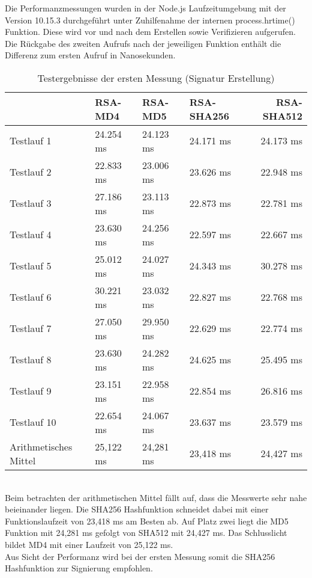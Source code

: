 Die Performanzmessungen wurden in der Node.js Laufzeitumgebung mit der Version 10.15.3 durchgeführt unter Zuhilfenahme der internen process.hrtime() Funktion. Diese wird vor und nach dem Erstellen sowie Verifizieren aufgerufen. Die Rückgabe des zweiten Aufrufs nach der jeweiligen Funktion enthält die Differenz zum ersten Aufruf in Nanosekunden.\\
\begin{table}[h]
	\begin{tabularx}{\textwidth}{p{}|X|X|X|r}
		& RSA-MD4 & RSA-MD5 & RSA-SHA256 & RSA-SHA512\\
		\hline
		Testlauf 1& 24.254 ms& 24.123 ms& 24.171 ms& 24.173 ms\\
		Testlauf 2& 22.833 ms& 23.006 ms& 23.626 ms& 22.948 ms\\
		Testlauf 3& 27.186 ms& 23.113 ms& 22.873 ms& 22.781 ms\\
		Testlauf 4& 23.630 ms& 24.256 ms& 22.597 ms& 22.667 ms\\
		Testlauf 5& 25.012 ms& 24.027 ms& 24.343 ms& 30.278 ms\\
		Testlauf 6& 30.221 ms& 23.032 ms& 22.827 ms& 22.768 ms\\
		Testlauf 7& 27.050 ms& 29.950 ms& 22.629 ms& 22.774 ms\\
		Testlauf 8& 23.630 ms& 24.282 ms& 24.625 ms& 25.495 ms\\
		Testlauf 9& 23.151 ms& 22.958 ms& 22.854 ms& 26.816 ms\\
		Testlauf 10& 22.654 ms& 24.067 ms& 23.637 ms& 23.579 ms\\
		\hline
		Arithmetisches Mittel& 25,122 ms& 24,281 ms& 23,418 ms& 24,427 ms\\
	\end{tabularx}
	\caption{Testergebnisse der ersten Messung (Signatur Erstellung)}
\end{table}\\
Beim betrachten der arithmetischen Mittel fällt auf, dass die Messwerte sehr nahe beieinander liegen. Die SHA256 Hashfunktion schneidet dabei mit einer Funktionslaufzeit von 23,418 ms am Besten ab. Auf Platz zwei liegt die MD5 Funktion mit 24,281 ms gefolgt von SHA512 mit 24,427 ms. Das Schlusslicht bildet MD4 mit einer Laufzeit von 25,122 ms.\\
Aus Sicht der Performanz wird bei der ersten Messung somit die SHA256 Hashfunktion zur Signierung empfohlen.\\
